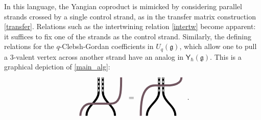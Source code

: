 \documentclass[10pt]{article}
\theoremstyle{definition}
\def\fg{\mathfrak{g}}
\def\myY{{\mathsf{Y}}}
\numberwithin{equation}{section}
\begin{document}
In this language, the Yangian coproduct is mimicked by considering parallel strands crossed by a single control strand, as in the transfer matrix construction \eqref{transfer}.
Relations such as the intertwining relation \eqref{intertw} become apparent: it suffices to fix one of the strands as the control strand.
Similarly, the defining relations for the $q$-Clebsh-Gordan coefficients in $U_q(\fg)$, which allow one to pull a 3-valent vertex across another strand have an analog in $\myY_{\hbar}(\fg)$.
This is a graphical depiction of \eqref{main_alg}:
\begin{equation}\label{CGanalog}
	\begin{array}{c}
		\begin{tikzpicture}
			\draw[line width=1mm] (-0.7,-1.2) to[out=90,in=270] (-0.1,0) -- (-0.1,0.7) (0.7,-1.2) to[out=90,in=270] (0.1,0) -- (0.1,0.7);
			\draw[dashed, white, line width =0.5mm] (-0.1,0) -- (-0.1,0.7) (0.1,0) -- (0.1,0.7);
			\draw[color1, line width = 1mm] (-1,-1.2) to[out=90,in=180] (-0.5,-0.6) -- (0.5,-0.6) to[out=0,in=270] (1,0.7);
		\end{tikzpicture}
	\end{array}=\begin{array}{c}
	\begin{tikzpicture}
		\draw[line width=1mm] (-0.7,-1.2) to[out=90,in=270] (-0.1,0) -- (-0.1,0.7) (0.7,-1.2) to[out=90,in=270] (0.1,0) -- (0.1,0.7);
		\draw[dashed, white, line width =0.5mm] (-0.1,0) -- (-0.1,0.7) (0.1,0) -- (0.1,0.7);
		\draw[color1, line width = 1mm] (-1,-1.2) to[out=90,in=180] (-0.3,0.3) -- (0.3,0.3) to[out=0,in=270] (1,0.7);
	\end{tikzpicture}
	\end{array}\,.
\end{equation}
\end{document}
